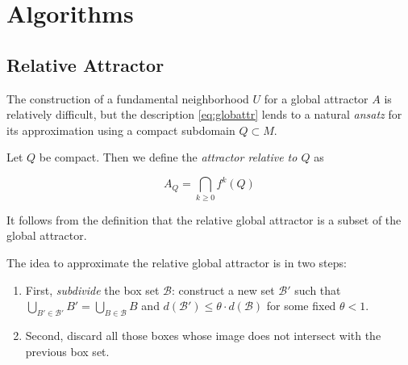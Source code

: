 \section{Algorithms}


\subsection{Relative Attractor}

The construction of a fundamental neighborhood $U$ for a global attractor $A$ is
relatively difficult, but the description \autoref{eq:globattr} lends to 
a natural \emph{ansatz} for its approximation using a compact subdomain $Q \subset M$. \\

\begin{definition}
    Let $Q$ be compact. Then we define the \emph{attractor relative to $Q$} as

    \begin{equation}
        A_Q = \bigcap\limits_{k \geq 0} f^k (Q)
    \end{equation}

\end{definition}

\begin{remark}
    It follows from the definition that the relative global attractor is a subset of the 
    global attractor.\\
\end{remark}

The idea to approximate the relative global attractor is in two steps:

\begin{enumerate}
    \item First, \emph{subdivide} the box set $\mathcal{B}$: construct a new set 
    $\mathcal{B}'$ such that $\bigcup_{B' \in \mathcal{B}'} B' = \bigcup_{B \in \mathcal{B}} B$ 
    and $d(\mathcal{B}') \leq \theta \cdot d(\mathcal{B})$ for some fixed $\theta < 1$. 
    \item Second, discard all those boxes whose image does not intersect with the 
    previous box set. 
\end{enumerate}

